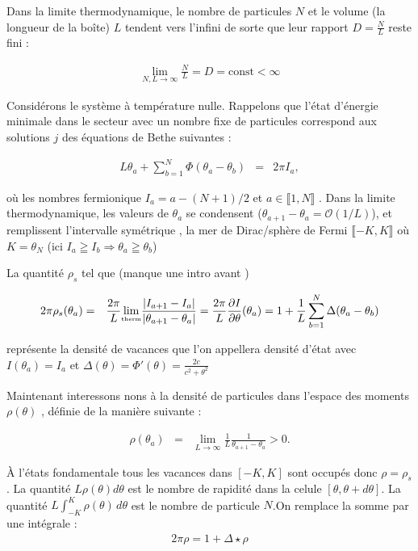 Dans la limite thermodynamique, le nombre de particules \( N \) et le volume 
(la longueur de la boîte) \( L \) tendent vers l'infini de sorte que leur rapport 
\( D = \frac{N}{L} \) reste fini :

\begin{eqnarray*}
	\lim_{N, L \to \infty} \frac{N}{L} = D = \mbox{const} < \infty	
\end{eqnarray*}

Considérons le système à température nulle. Rappelons que l'état 
d'énergie minimale dans le secteur avec un nombre fixe de particules 
correspond aux solutions \( j \) des équations de Bethe suivantes :

\begin{eqnarray*}
	L \theta_a + \sum_{b = 1}^N \Phi ( \theta_a - \theta_b ) & = & 2\pi I_a ,	
\end{eqnarray*}

où les nombres fermionique $I_a = a - (N+1)/2$ et $a \in \llbracket 1 , N  \rrbracket$ . Dans la limite thermodynamique, les valeurs de \( \theta_a \) se condensent (\(\theta_{a+1} - \theta_a = \mathcal{O}(1/L)\)), et remplissent l'intervalle symétrique , la mer de Dirac/sphère de Fermi  \(\llbracket-K, K\rrbracket\) où $K = \theta_N$ (ici $I_a \geqq I_b \Rightarrow \theta_a \geqq \theta_b$)

La quantité $\rho_s$ tel que (manque une intro avant ) 

\begin{eqnarray*}
	2\pi \rho_s (\theta_a) & = & \frac{2\pi}{L}\underset{\tiny \mbox{therm}}{\lim} \frac{ \vert I_{a+1} - I_{a} \vert}{ \vert \theta_{a+1} - \theta_a \vert} = \frac{2\pi}{L} \frac{ \partial I}{\partial \theta } ( \theta_a ) = 1 	+ \frac{1}{L}\sum_{b = 1}^N \Delta (\theta_a - \theta_b)
\end{eqnarray*}

représente la densité de vacances que l'on appellera densité d'état avec $I(\theta_a) = I_a$ et  $\Delta(\theta) = \Phi'(\theta)  = \frac{2c}{c^2 + \theta^2}$

Maintenant interessons nons à la densité de particules dans l'espace des moments \( \rho(\theta) \) , définie de la manière suivante :

\begin{eqnarray*}
	\rho(\theta_a)  &=  &\lim_{L \to \infty} \frac{1}{L} \frac{1}{\theta_{a+1} - \theta_a} > 0.	
\end{eqnarray*}

À l'états fondamentale tous les vacances dans $[-K , K ]$  sont occupés donc $\rho = \rho_s$. La quantité $L\rho(\theta)d\theta$ est le nombre de rapidité dans la celule $[ \theta , \theta + d \theta ] $. La quantité $L \int_{-K}^K \rho (\theta ) \, d\theta $ est le nombre de particule $N$.On remplace la somme par une intégrale :
\begin{eqnarray*}
	2\pi \rho  = 1 + \Delta \star \rho 	
\end{eqnarray*}



 


